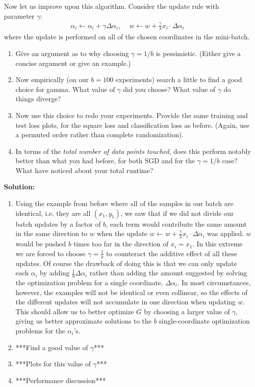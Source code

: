 \documentclass{article}
\newcommand{\solution}{\textbf{\vskip 0.2cm \large Solution:\\}}
\begin{document}
Now let us improve upon this algorithm. Consider the update rule with parameter $\gamma$:
\begin{align}
	\alpha_i \leftarrow \alpha_i+\gamma\Delta\alpha_i, \, \quad w \leftarrow
	w+\frac{\gamma}{\lambda}x_i \cdot \Delta\alpha_i
\end{align}
where the update is performed on all of the chosen coordinates in the mini-batch.


\begin{enumerate}
	\item Give an argument as to why choosing $\gamma=1/b$ is pessimistic. (Either give a concise argument or give an example.)
	\item Now empirically (on our $b=100$ experiments) search a little to find a good choice for gamma. What value of $\gamma$ did you choose? What value  of $\gamma$ do things diverge?
	\item  Now use this choice to redo your experiments. Provide the same training and test loss plots, for the square loss and classification loss as before. (Again, use a permuted order rather than complete randomization).
	\item In terms of the \emph{total number of data points touched}, does this perform notably better than what you had before, for both SGD and for the $\gamma=1/b$ case? What have noticed about your total runtime?
\end{enumerate}

\solution

\begin{enumerate}
	\item Using the example from before where all of the samples in our batch are identical, i.e. they are all $(x_1,y_1)$, we saw that if we did not divide our batch updates by a factor of $b$, each term would contribute the same amount in the same direction to $w$ when the update $w\leftarrow w+\tfrac\gamma\lambda x_i\cdot\Delta\alpha_i$ was applied. $w$ would be pushed $b$ times too far in the direction of $x_i=x_1$. In this extreme we are forced to choose $\gamma=\tfrac1b$ to counteract the additive effect of all these updates. Of course the drawback of doing this is that we can only update each $\alpha_i$ by adding $\tfrac1b\Delta\alpha_i$ rather than adding the amount suggested by solving the optimization problem for a single coordinate, $\Delta\alpha_i$. In most circumstances, however, the examples will not be identical or even collinear, so the effects of the different updates will not accumulate in one direction when updating $w$. This should allow us to better optimize $G$ by choosing a larger value of $\gamma$, giving us better approximate solutions to the $b$ single-coordinate optimization problems for the $\alpha_i$'s.

	\item ***Find a good value of $\gamma$***

	\item ***Plots for this value of $\gamma$***

	\item ***Performance discussion***
\end{enumerate}
\end{document}
